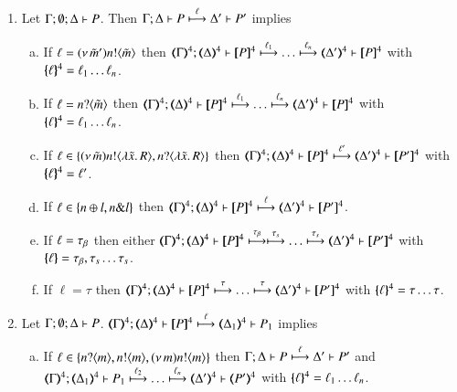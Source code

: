 \begin{proposition}\myrm
	\label{app:prop:op_corr_pHOp_to_HOp}
%
	\begin{enumerate}
		\item	Let $\Gamma; \emptyset; \Delta \vdash P$. Then
			$\Gamma; \Delta \vdash P \stackrel{\ell}{\longmapsto} \Delta' \vdash P'$ implies
%
			\begin{enumerate}[a)]
				\item	If $\ell = (\nu\, \tilde{m}') n ! \langle \tilde{m} \rangle$ then
					$\horel{\tmap{\Gamma}{4}}{\tmap{\Delta}{4}}{\pmap{P}{4}}{\hby{\ell_1} \dots \hby{\ell_n}}{\tmap{\Delta'}{4}}{\pmap{P}{4}}$
					with $\{\!\!\{\ell\}\!\!\}^{4} = \ell_1 \dots \ell_n$.

				\item	If $\ell = n ? \langle \tilde{m} \rangle$ then
					$\horel{\tmap{\Gamma}{4}}{\tmap{\Delta}{4}}{\pmap{P}{4}}{\hby{\ell_1} \dots \hby{\ell_n}}{\tmap{\Delta'}{4}}{\pmap{P}{4}}$
					with $\{\!\!\{\ell\}\!\!\}^{4} = \ell_1 \dots \ell_n$.

				\item	If $\ell \in \{(\nu\, \tilde{m}) n ! \langle \lambda \tilde{x}.\,R \rangle, n ? \langle \lambda \tilde{x}.\,R \rangle\}$ then
					$\horel{\tmap{\Gamma}{4}}{\tmap{\Delta}{4}}{\pmap{P}{4}}{\hby{\ell'}}
					{\tmap{\Delta'}{4}}{\pmap{P'}{4}}$ with $\{\!\!\{\ell\}\!\!\}^{4} = \ell'$.

				\item	If $\ell \in \{n \oplus l, n \& l\}$ then
					$\horel{\tmap{\Gamma}{4}}{\tmap{\Delta}{4}}{\pmap{P}{4}}{\hby{\ell}}
					{\tmap{\Delta'}{4}}{\pmap{P'}{4}}$.

				\item	If $\ell = \tau_{\beta}$ then either
					$\horel{\tmap{\Gamma}{4}}{\tmap{\Delta}{4}}{\pmap{P}{4}}{\hby{\btau} \hby{\stau} \dots \hby{\stau}}
					{\tmap{\Delta'}{4}}{\pmap{P'}{4}}$ with $\{\!\!\{\ell\}\!\!\} = \tau_{\beta}, \tau_{s} \dots \tau_{s}$.

				\item	If $\ell = \tau$ then %
					$\horel{\tmap{\Gamma}{4}}{\tmap{\Delta}{4}}{\pmap{P}{4}}{\hby{\tau} \dots \hby{\tau}}
					{\tmap{\Delta'}{4}}{\pmap{P'}{4}}$ with $\{\!\!\{\ell\}\!\!\}^{4} = \tau \dots \tau$.
			\end{enumerate}

		\item	Let $\Gamma; \emptyset; \Delta \vdash P$.
			$\horel{\tmap{\Gamma}{4}}{\tmap{\Delta}{4}}{\pmap{P}{4}}{\hby{\ell}}
			{\tmap{\Delta_1}{4}}{P_1}$ implies
%
			\begin{enumerate}[a)]
				\item	If $\ell \in \{n ? \langle m \rangle, n ! \langle m \rangle, (\nu\, m) n ! \langle m \rangle\}$ then
					$\Gamma; \Delta \vdash P \stackrel{\ell}{\longmapsto} \Delta' \vdash P'$ and\\
					$\horel{\tmap{\Gamma}{4}}{\tmap{\Delta_1}{4}}{P_1}{\hby{\ell_2} \dots \hby{\ell_n}}
					{\tmap{\Delta'}{4}}{\tmap{P'}{4}}$ with $\{\!\!\{\ell\}\!\!\}^{4} = \ell_1 \dots \ell_n$.


\end{enumerate}
\end{enumerate}
\end{proposition}
